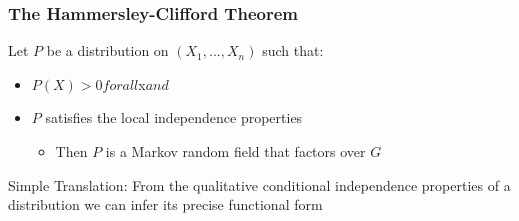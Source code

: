 \documentclass{article}
\begin{document}
\subsubsection{The Hammersley-Clifford Theorem}
\begin{flushleft}
    Let $P$ be a distribution on $(X_1,...,X_n)$ such that:
    \begin{itemize}
        \item $P(X)>0 for all $x$ and$
        \item $P$ satisfies the local independence properties
        \begin{itemize}
            \item Then $P$ is a Markov random field that factors over $G$
        \end{itemize}
    \end{itemize}
    Simple Translation: From the qualitative conditional independence properties of a distribution we can infer its precise functional form
\end{flushleft}
\end{document}
